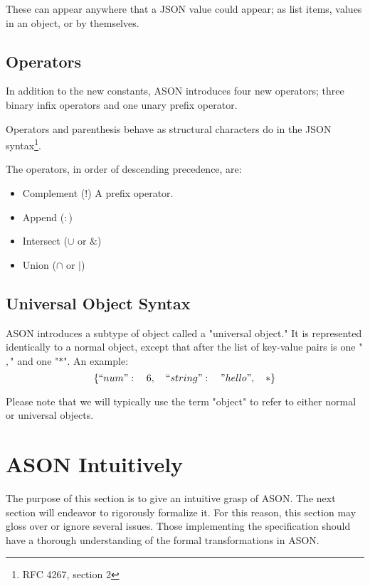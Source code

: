 \documentclass[letterpaper]{article}
\begin{document}
These can appear anywhere that a JSON value could appear; as list items, values
in an object, or by themselves.

\subsection{Operators}
In addition to the new constants, ASON introduces four new operators; three
binary infix operators and one unary prefix operator.

Operators and parenthesis behave as structural characters do in the JSON
syntax\footnote{RFC 4267, section 2}.

\begin{samepage}
The operators, in order of descending precedence, are:

\begin{itemize}
\item Complement (\(!\)) A prefix operator.
\item Append (\(:\))
\item Intersect (\(\cup\) or \(\&\))
\item Union (\(\cap\) or \(|\))
\end{itemize}
\end{samepage}

\begin{samepage}
\subsection{Universal Object Syntax}
ASON introduces a subtype of object called a "universal object." It is
represented identically to a normal object, except that after the list of
key-value pairs is one "\(,\)" and one "\(*\)". An example:
%
\begin{equation}
\{ ``num":\quad6,\quad ``string":\quad"hello",\quad *\}
\end{equation}
\end{samepage}

Please note that we will typically use the term "object" to refer to either
normal or universal objects.

\section{ASON Intuitively}
The purpose of this section is to give an intuitive grasp of ASON. The next
section will endeavor to rigorously formalize it. For this reason, this section
may gloss over or ignore several issues. Those implementing the specification
should have a thorough understanding of the formal transformations in ASON.
\end{document}
